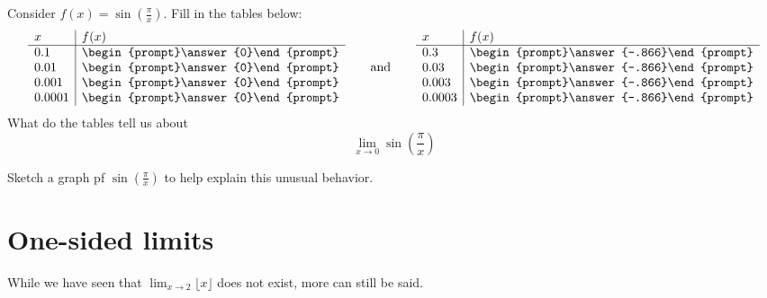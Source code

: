 \documentclass[handout]{ximera}
\begin{document}
\begin{question}
  Consider $f(x) = \sin\left(\frac{\pi}{x}\right)$. Fill in the 
  tables below:
  \[
  \begin{array}{l|l}
    x      & f(x)      \\ \hline
    0.1    & \begin{prompt}\answer{0}\end{prompt}\\
    0.01   & \begin{prompt}\answer{0}\end{prompt}\\
    0.001  & \begin{prompt}\answer{0}\end{prompt}\\
    0.0001 & \begin{prompt}\answer{0}\end{prompt} 
  \end{array}
  \qquad\text{and}\qquad
  \begin{array}{l|l}
    x      & f(x)            \\ \hline
    0.3    &  \begin{prompt}\answer{-.866}\end{prompt} \\
    0.03   &  \begin{prompt}\answer{-.866}\end{prompt} \\
    0.003  &  \begin{prompt}\answer{-.866}\end{prompt} \\
    0.0003 &  \begin{prompt}\answer{-.866}\end{prompt}
  \end{array}
  \]
  What do the tables tell us about
  \[
  \lim_{x\to 0}\sin\left(\frac{\pi}{x}\right)
  \]
 
  Sketch a graph pf $\sin\left(\frac{\pi}{x}\right)$ to help explain this unusual behavior.
  \newpage
\end{question}



\section{One-sided limits}


While we have seen that $\lim_{x\to 2}\lfloor x\rfloor$ does not
exist, more can still be said.
\end{document}
